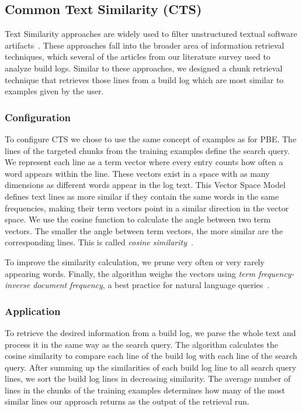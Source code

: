 \subsection{Common Text Similarity (CTS)}
Text Similarity approaches are widely used to filter unstructured
textual software artifacts~\cite{runeson2007detection,
marcus2005recovery,antoniol2002recovering,mccarey2006recommending}.
These approaches fall into the broader area of information retrieval
techniques, which several of the articles from our literature survey
used to analyze build logs.
Similar to these approaches, we designed a chunk retrieval
technique that
retrieves those lines from a build log which are most
similar to examples given by the user.

\subsubsection{Configuration}
To configure CTS we chose to use
the same concept of examples as for PBE.
The lines of the targeted chunks from the training examples define the
search query.
We represent each line as a term vector where every entry counts
how often a word appears within the line.
These vectors exist in a space with as many dimensions as different
words appear in the log text.
This Vector Space Model~\cite{schutze2008introduction} defines
text lines as more similar if they contain the same words in the same
frequencies, making their term vectors point in a similar direction
in the vector space.
We use the cosine function to calculate the angle between two
term vectors.
The smaller the angle between term vectors, the more similar are the
corresponding lines.
This is called \emph{cosine similarity}~\cite{korenius2007principal}.

To improve the similarity calculation, we prune very often or
very rarely appearing words.
Finally, the
algorithm weighs the vectors using \emph{term frequency-inverse
document frequency}, a best practice for natural
language queries~\cite{lee1997document}.

\subsubsection{Application}
To retrieve the desired information from a build log, we parse the
whole text and process it in the same way as the search query.
The algorithm calculates the cosine
similarity to compare each line of the
build log with each line of the search query.
After summing up the
similarities of each build log line to all search query lines, we sort
the build log lines in decreasing similarity.
The average number of
lines in the chunks of the training examples determines how many of
the most similar lines our approach returns as the output of the retrieval
run.

